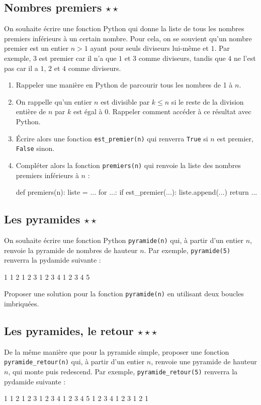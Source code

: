\documentclass[12pt,a4paper, oneside]{article}
\theoremstyle{definition}
\begin{document}
   \subsection{Nombres premiers $\star\star$}\label{subsec:nombres-premiers}
   On souhaite écrire une fonction Python qui donne la liste de tous les nombres premiers inférieurs à un certain nombre.
   Pour cela, on se souvient qu'un nombre premier est un entier $n > 1$ ayant pour seuls diviseurs lui-même et $1$.
   Par exemple, $3$ est premier car il n'a que $1$ et $3$ comme diviseurs, tandis que $4$ ne l'est pas car il a $1$, $2$ et $4$ comme diviseurs.

   \begin{enumerate}
      \item Rappeler une manière en Python de parcourir tous les nombres de 1 à $n$.
      \item On rappelle qu'un entier $n$ est divisible par $k \leq n$ si le reste de la division entière de $n$ par $k$ est égal à 0.
      Rappeler comment accéder à ce résultat avec Python.
      \item Écrire alors une fonction \texttt{est\_premier(n)} qui renverra \texttt{True} si $n$ est premier, \texttt{False} sinon.
      \item Compléter alors la fonction \texttt{premiers(n)} qui renvoie la liste des nombres premiers inférieurs à $n$ :
      \begin{pyverbatim}
         def premiers(n):
            liste = ...
            for ...:
               if est_premier(...):
                  liste.append(...)
            return ...
      \end{pyverbatim}
   \end{enumerate}

   \subsection{Les pyramides $\star\star$}\label{subsec:pyramides}
   On souhaite écrire une fonction Python \texttt{pyramide(n)} qui, à partir d'un entier $n$, renvoie la pyramide de nombres de hauteur $n$.
   Par exemple, \texttt{pyramide(5)} renverra la pydamide suivante :
   \begin{pyverbatim}
      1
      1 2
      1 2 3
      1 2 3 4
      1 2 3 4 5
   \end{pyverbatim}
   Proposer une solution pour la fonction \texttt{pyramide(n)} en utilisant deux boucles imbriquées.

   \subsection{Les pyramides, le retour $\star\star\star$}\label{subsec:pyramides-retour}
   De la même manière que pour la pyramide simple, proposer une fonction \texttt{pyramide\_retour(n)} qui, à partir d'un entier $n$, renvoie une pyramide de hauteur $n$, qui monte puis redescend.
   Par exemple, \texttt{pyramide\_retour(5)} renverra la pydamide suivante :
   \begin{pyverbatim}
      1
      1 2
      1 2 3
      1 2 3 4
      1 2 3 4 5
      1 2 3 4
      1 2 3
      1 2
      1
   \end{pyverbatim}
\end{document}
